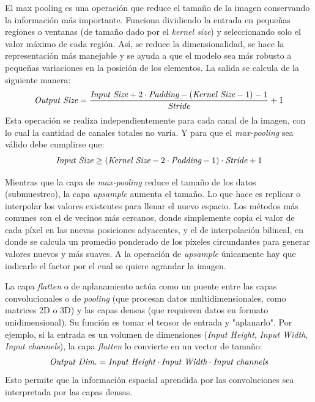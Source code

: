 El max pooling es una operación que reduce el tamaño de la imagen conservando la información más importante. Funciona dividiendo la entrada en pequeñas regiones o ventanas (de tamaño dado por el \emph{kernel size}) y seleccionando solo el valor máximo de cada región. Así, se reduce la dimensionalidad, se hace la representación más manejable y se ayuda a que el modelo sea más robusto a pequeñas variaciones en la posición de los elementos. La salida se calcula de la siguiente manera:
\begin{equation}
    \emph{\text{Output Size}} = \frac{\emph{\text{Input Size}} + 2 \cdot \emph{\text{Padding}} - (\emph{\text{Kernel Size}} - 1) - 1}{\emph{\text{Stride}}} + 1
\end{equation}
Esta operación se realiza independientemente para cada canal de la imagen, con lo cual la cantidad de canales totales no varía. Y para que el \emph{max-pooling} sea válido debe cumplirse que:
\begin{equation}
    \emph{\text{Input Size}} \geq (\emph{\text{Kernel Size}} - 2\cdot \emph{\text{Padding}} - 1) \cdot \emph{\text{Stride}} + 1
\end{equation}

Mientras que la capa de \emph{max-pooling} reduce el tamaño de los datos (submuestreo), la capa \emph{upsample} aumenta el tamaño. Lo que hace es replicar o interpolar los valores existentes para llenar el nuevo espacio. Los métodos más comunes son el de vecinos más cercanos, donde simplemente copia el valor de cada píxel en las nuevas posiciones adyacentes, y el de interpolación bilineal, en donde se calcula un promedio ponderado de los píxeles circundantes para generar valores nuevos y más suaves. A la operación de \emph{upsample} únicamente hay que indicarle el factor por el cual se quiere agrandar la imagen.

La capa \emph{flatten} o de aplanamiento actúa como un puente entre las capas convolucionales o de \emph{pooling} (que procesan datos multidimensionales, como matrices 2D o 3D) y las capas densas (que requieren datos en formato unidimensional). Su función es tomar el tensor de entrada y "aplanarlo". Por ejemplo, si la entrada es un volumen de dimensiones (\emph{Input Height}, \emph{Input Width}, \emph{Input channels}), la capa \emph{flatten} lo convierte en un vector de tamaño:
\begin{equation}
    \emph{Output Dim.} = \emph{Input Height} \cdot \emph{Input Width} \cdot \emph{Input channels}
\end{equation}
Esto permite que la información espacial aprendida por las convoluciones sea interpretada por las capas densas.

